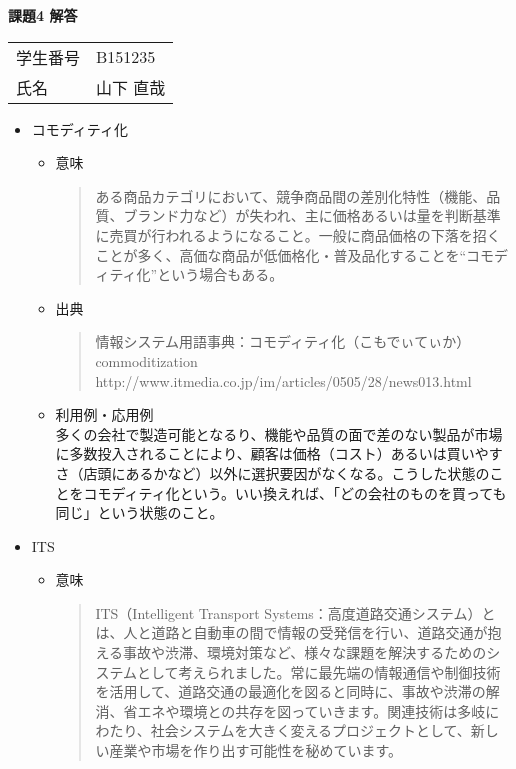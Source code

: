 \textwidth=18cm
\oddsidemargin=-0.5cm
\textheight=26cm
\topmargin=-1.5cm

\begin{center}
  \large\bf 課題4 解答
\end{center}
\begin{flushright}
  \begin{tabular}{ll}
    学生番号 & B151235\\
    氏名 & 山下 直哉\\
  \end{tabular}
\end{flushright}
\begin{itemize}
\item コモディティ化
  \begin{itemize}
  \item 意味\\
    \begin{quote}
      ある商品カテゴリにおいて、競争商品間の差別化特性（機能、品質、ブランド力など）が失われ、主に価格あるいは量を判断基準に売買が行われるようになること。一般に商品価格の下落を招くことが多く、高価な商品が低価格化・普及品化することを“コモディティ化”という場合もある。\\
    \end{quote}
  \item 出典\\
    \begin{quote}
      情報システム用語事典：コモディティ化（こもでぃてぃか）commoditization\\
      http://www.itmedia.co.jp/im/articles/0505/28/news013.html\\
    \end{quote}
  \item 利用例・応用例\\
    多くの会社で製造可能となるり、機能や品質の面で差のない製品が市場に多数投入されることにより、顧客は価格（コスト）あるいは買いやすさ（店頭にあるかなど）以外に選択要因がなくなる。こうした状態のことをコモディティ化という。いい換えれば、「どの会社のものを買っても同じ」という状態のこと。
  \end{itemize}
\item ITS
  \begin{itemize}
  \item 意味\\
    \begin{quote}
      ITS（Intelligent Transport Systems：高度道路交通システム）とは、人と道路と自動車の間で情報の受発信を行い、道路交通が抱える事故や渋滞、環境対策など、様々な課題を解決するためのシステムとして考えられました。常に最先端の情報通信や制御技術を活用して、道路交通の最適化を図ると同時に、事故や渋滞の解消、省エネや環境との共存を図っていきます。関連技術は多岐にわたり、社会システムを大きく変えるプロジェクトとして、新しい産業や市場を作り出す可能性を秘めています。\\

\end{quote}
\end{itemize}
\end{itemize}

